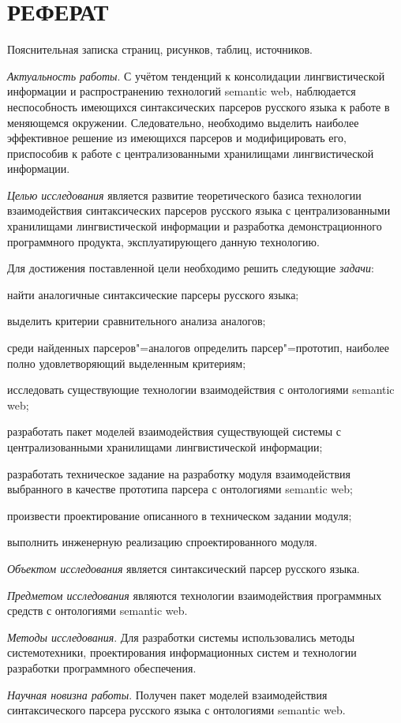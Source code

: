 \section*{\centering РЕФЕРАТ}

Пояснительная записка  страниц,  рисунков, 
таблиц,  источников.

\emph{Актуальность работы}. С учётом тенденций к консолидации лингвистической 
информации и распространению технологий semantic web, наблюдается неспособность
имеющихся синтаксических парсеров русского языка к работе в меняющемся окружении. 
Следовательно, необходимо выделить наиболее эффективное решение из имеющихся
парсеров и модифицировать его, приспособив к работе с централизованными
хранилищами лингвистической информации.

\emph{Целью исследования} является развитие теоретического базиса технологии
взаимодействия синтаксических парсеров русского языка с централизованными
хранилищами лингвистической информации и разработка демонстрационного программного
продукта, эксплуатирующего данную технологию.

Для достижения поставленной цели необходимо решить следующие \emph{задачи}:
\begin{list}{}{\leftmargin=1.5cm}
  \item найти аналогичные синтаксические парсеры русского языка;
  \item выделить критерии сравнительного анализа аналогов;
  \item среди найденных парсеров"=аналогов определить парсер"=прототип,
  наиболее полно удовлетворяющий выделенным критериям;
  \item исследовать существующие технологии взаимодействия с онтологиями semantic
  web;
  \item разработать пакет моделей взаимодействия существующей системы с
  централизованными хранилищами лингвистической информации;
  \item разработать техническое задание на разработку модуля взаимодействия выбранного
  в качестве прототипа парсера с онтологиями semantic web;
  \item произвести проектирование описанного в техническом задании модуля;
  \item выполнить инженерную реализацию спроектированного модуля.
\end{list}

\emph{Объектом исследования} является синтаксический парсер русского языка.

\emph{Предметом исследования} являются технологии взаимодействия программных
средств с онтологиями semantic web.

\emph{Методы исследования}. Для разработки системы использовались методы
системотехники, проектирования информационных систем и технологии разработки
программного обеспечения.

\emph{Научная новизна работы}. Получен пакет моделей взаимодействия синтаксического
парсера русского языка с онтологиями semantic web.
